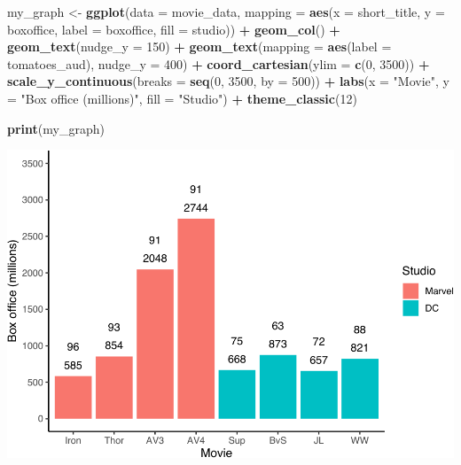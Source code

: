 \documentclass[
]{krantz}
\makeatletter
\newenvironment{Shaded}{\begin{snugshade}}{\end{snugshade}}
\newcommand{\DataTypeTok}[1]{\textcolor[rgb]{0.27,0.27,0.27}{#1}}
\newcommand{\DecValTok}[1]{\textcolor[rgb]{0.06,0.06,0.06}{#1}}
\newcommand{\KeywordTok}[1]{\textcolor[rgb]{0.27,0.27,0.27}{\textbf{#1}}}
\newcommand{\NormalTok}[1]{#1}
\newcommand{\OperatorTok}[1]{\textcolor[rgb]{0.43,0.43,0.43}{\textbf{#1}}}
\newcommand{\StringTok}[1]{\textcolor[rgb]{0.5,0.5,0.5}{#1}}
\newenvironment{kframe}{%
\medskip{}
\setlength{\fboxsep}{.8em}
 \def\at@end@of@kframe{}%
 \ifinner\ifhmode%
  \def\at@end@of@kframe{\end{minipage}}%
  \begin{minipage}{\columnwidth}%
 \fi\fi%
 \def\FrameCommand##1{\hskip\@totalleftmargin \hskip-\fboxsep
 \colorbox{shadecolor}{##1}\hskip-\fboxsep
     \hskip-\linewidth \hskip-\@totalleftmargin \hskip\columnwidth}%
 \MakeFramed {\advance\hsize-\width
   \@totalleftmargin\z@ \linewidth\hsize
   \@setminipage}}%
 {\par\unskip\endMakeFramed%
 \at@end@of@kframe}
\renewenvironment{Shaded}{\begin{kframe}}{\end{kframe}}
\makeatother
\begin{document}
\begin{Shaded}
\begin{Highlighting}[]
\NormalTok{my_graph <-}\StringTok{ }\KeywordTok{ggplot}\NormalTok{(}\DataTypeTok{data =}\NormalTok{ movie_data,}
           \DataTypeTok{mapping =} \KeywordTok{aes}\NormalTok{(}\DataTypeTok{x =}\NormalTok{ short_title,}
                         \DataTypeTok{y =}\NormalTok{ boxoffice,}
                         \DataTypeTok{label =}\NormalTok{ boxoffice, }
                         \DataTypeTok{fill =}\NormalTok{ studio)) }\OperatorTok{+}
\StringTok{  }\KeywordTok{geom_col}\NormalTok{() }\OperatorTok{+}
\StringTok{  }\KeywordTok{geom_text}\NormalTok{(}\DataTypeTok{nudge_y =} \DecValTok{150}\NormalTok{)  }\OperatorTok{+}
\StringTok{  }\KeywordTok{geom_text}\NormalTok{(}\DataTypeTok{mapping =} \KeywordTok{aes}\NormalTok{(}\DataTypeTok{label =}\NormalTok{ tomatoes_aud), }
            \DataTypeTok{nudge_y =} \DecValTok{400}\NormalTok{) }\OperatorTok{+}
\StringTok{  }\KeywordTok{coord_cartesian}\NormalTok{(}\DataTypeTok{ylim =} \KeywordTok{c}\NormalTok{(}\DecValTok{0}\NormalTok{, }\DecValTok{3500}\NormalTok{)) }\OperatorTok{+}
\StringTok{  }\KeywordTok{scale_y_continuous}\NormalTok{(}\DataTypeTok{breaks =} \KeywordTok{seq}\NormalTok{(}\DecValTok{0}\NormalTok{, }\DecValTok{3500}\NormalTok{, }\DataTypeTok{by =} \DecValTok{500}\NormalTok{)) }\OperatorTok{+}
\StringTok{  }\KeywordTok{labs}\NormalTok{(}\DataTypeTok{x =} \StringTok{"Movie"}\NormalTok{,}
       \DataTypeTok{y =} \StringTok{"Box office (millions)"}\NormalTok{,}
       \DataTypeTok{fill =} \StringTok{"Studio"}\NormalTok{) }\OperatorTok{+}
\StringTok{  }\KeywordTok{theme_classic}\NormalTok{(}\DecValTok{12}\NormalTok{)}

\KeywordTok{print}\NormalTok{(my_graph)}
\end{Highlighting}
\end{Shaded}

\includegraphics{bookdown_files/figure-latex/unnamed-chunk-251-1.pdf}
\end{document}
